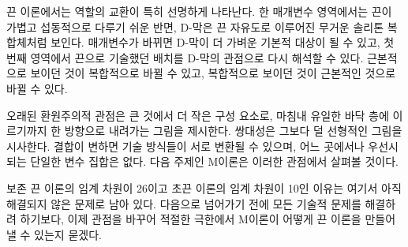 끈 이론에서는 역할의 교환이 특히 선명하게 나타난다. 한 매개변수 영역에서는 끈이 가볍고 섭동적으로 다루기 쉬운 반면, D-막은 끈 자유도로 이루어진 무거운 솔리톤 복합체처럼 보인다. 매개변수가 바뀌면 D-막이 더 가벼운 기본적 대상이 될 수 있고, 첫 번째 영역에서 끈으로 기술했던 배치를 D-막의 관점으로 다시 해석할 수 있다. 근본적으로 보이던 것이 복합적으로 바뀔 수 있고, 복합적으로 보이던 것이 근본적인 것으로 바뀔 수 있다.

오래된 환원주의적 관점은 큰 것에서 더 작은 구성 요소로, 마침내 유일한 바닥 층에 이르기까지 한 방향으로 내려가는 그림을 제시한다. 쌍대성은 그보다 덜 선형적인 그림을 시사한다. 결합이 변하면 기술 방식들이 서로 변환될 수 있으며, 어느 곳에서나 우선시되는 단일한 변수 집합은 없다. 다음 주제인 M이론은 이러한 관점에서 살펴볼 것이다.

보존 끈 이론의 임계 차원이 26이고 초끈 이론의 임계 차원이 10인 이유는 여기서 아직 해결되지 않은 문제로 남아 있다. 다음으로 넘어가기 전에 모든 기술적 문제를 해결하려 하기보다, 이제 관점을 바꾸어 적절한 극한에서 M이론이 어떻게 끈 이론을 만들어 낼 수 있는지 묻겠다.